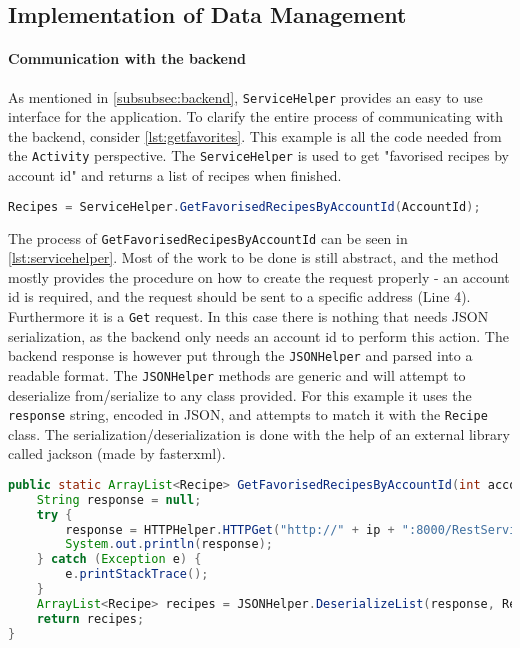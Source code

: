 \subsection{Implementation of Data Management}
\label{subsec:datamanagement}

\paragraph{Communication with the backend}
As mentioned in \ref{subsubsec:backend}, \texttt{ServiceHelper} provides an easy to use interface for the application. To clarify the entire process of communicating with the backend, consider \ref{lst:getfavorites}. This example is all the code needed from the \texttt{Activity} perspective. The \texttt{ServiceHelper} is used to get "favorised recipes by account id" and returns a list of recipes when finished.

\begin{lstlisting}[language=java, label={lst:getfavorites}, caption={Sending a backend request from an Activity}]
Recipes = ServiceHelper.GetFavorisedRecipesByAccountId(AccountId);
\end{lstlisting}

The process of \texttt{GetFavorisedRecipesByAccountId} can be seen in \ref{lst:servicehelper}. Most of the work to be done is still abstract, and the method mostly provides the procedure on how to create the request properly - an account id is required, and the request should be sent to a specific address (Line 4). Furthermore it is a \texttt{Get} request.
In this case there is nothing that needs JSON serialization, as the backend only needs an account id to perform this action. The backend response is however put through the \texttt{JSONHelper} and parsed into a readable format. The \texttt{JSONHelper} methods are generic and will attempt to deserialize from/serialize to any class provided. For this example it uses the \texttt{response} string, encoded in JSON, and attempts to match it with the \texttt{Recipe} class. The serialization/deserialization is done with the help of an external library called jackson (made by fasterxml)\cite{jackson}.

\begin{lstlisting}[language=java, label={lst:servicehelper}, caption={GetFavorisedRecipesByAccountId from ServiceHelper}]
public static ArrayList<Recipe> GetFavorisedRecipesByAccountId(int accountId){
    String response = null;
    try {
        response = HTTPHelper.HTTPGet("http://" + ip + ":8000/RestService/Favorises/GetFavorisedRecipesByAccountId?accountId=" + accountId);
        System.out.println(response);
    } catch (Exception e) {
        e.printStackTrace();
    }
    ArrayList<Recipe> recipes = JSONHelper.DeserializeList(response, Recipe.class);
    return recipes;
}
\end{lstlisting}

